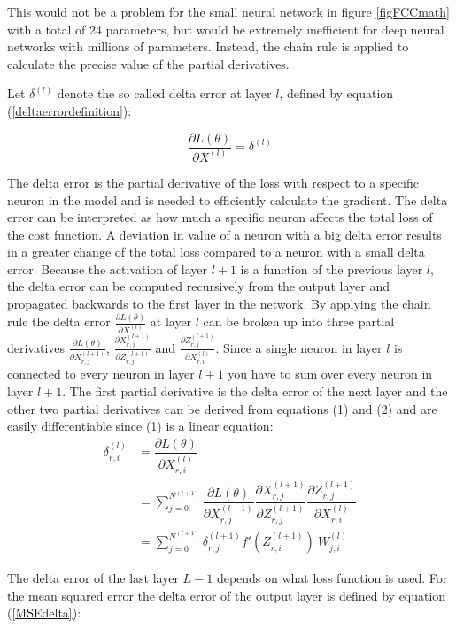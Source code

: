 \documentclass[a4paper,11pt,twoside]{article}
\newcommand*{\pd}[2]{\ensuremath{\dfrac{\partial #1}{\partial #2}}}
\newcommand*{\inpd}[2]{\ensuremath{\frac{\partial #1}{\partial #2}}}
\begin{document}
This would not be a problem for the small neural network in figure \ref{figFCCmath} with a total of 24 parameters, but would be extremely inefficient for deep neural networks with millions of parameters. Instead, the chain rule is applied to calculate the precise value of the partial derivatives.

Let $\delta^{(l)}$ denote the so called delta error at layer $l$, defined by equation (\ref{deltaerrordefinition}):

\begin{equation}\label{deltaerrordefinition}
\inpd{L(\theta)}{X^{(l)}} = \delta^{(l)}
\end{equation}

The delta error is the partial derivative of the loss with respect to a specific neuron in the model and is needed to efficiently calculate the gradient. The delta error can be interpreted as how much a specific neuron affects the total loss of the cost function. A deviation in value of a neuron with a big delta error results in a greater change of the total loss compared to a neuron with a small delta error. Because the activation of layer $l+1$ is a function of the previous layer $l$, the delta error can be computed recursively from the output layer and propagated backwards to the first layer in the network. By applying the chain rule the delta error $\inpd{L(\theta)}{X^{(l)}}$  at layer $l$ can be broken up into three partial derivatives $\inpd{L(\theta)}{X^{(l+1)}_{r,j}}$, $\inpd{X^{(l+1)}_{r,j}}{Z^{(l+1)}_{r,j}}$ and $\inpd{Z^{(l+1)}_{r,j}}{X^{(l)}_{r,i}}$. Since a single neuron in layer $l$ is connected to every neuron in layer $l+1$ you have to sum over every neuron in layer $l+1$. The first partial derivative is the delta error of the next layer and the other two partial derivatives can be derived from equations (1) and (2) and are easily differentiable since (1) is a linear equation:
\begin{equation}\label{dLdX_FCC}
\begin{split}
\delta^{(l)}_{r,i}
	& = \pd{L(\theta)}{X^{(l)}_{r,i}}  \\
	& = \sum^{N^{(l+1)}}_{j=0} \pd{L(\theta)}{X^{(l+1)}_{r,j}} \pd{X^{(l+1)}_{r,j}}{Z^{(l+1)}_{r,j}} \pd{Z^{(l+1)}_{r,j}}{X^{(l)}_{r,i}} \\
	& = \sum^{N^{(l+1)}}_{j=0} \delta^{(l+1)}_{r,j} f'(Z^{(l+1)}_{r,i}) \ W^{(l)}_{j,i} 
\end{split}
\end{equation}

The delta error of the last layer $L-1$ depends on what loss function is used. For the mean squared error the delta error of the output layer is defined by equation (\ref{MSEdelta}): 
\end{document}
